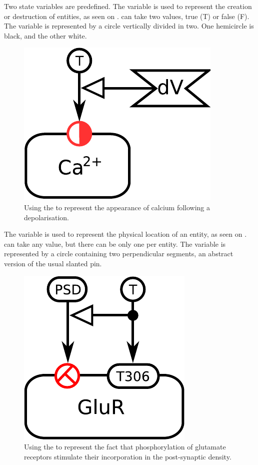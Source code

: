 Two state variables are predefined. The variable  is used to represent the creation or destruction of entities, as seen on \label{sec:existence}.  can take two values, true (T) or false (F). The variable is represented by a circle vertically divided in two. One hemicircle is black, and the other white. 

\begin{figure}[H]
  \centering
  \includegraphics[scale = 0.5]{examples/ex-existence}
  \caption{Using the   to represent the appearance of calcium following a depolarisation.}
  \label{fig:ex-existence}
\end{figure}

The variable  is used to represent the physical location of an entity, as seen on \label{sec:location}.  can take any value, but there can be only one  per entity. The variable is represented by a circle containing two perpendicular segments, an abstract version of the usual slanted pin.

\begin{figure}[H]
  \centering
  \includegraphics[scale = 0.5]{examples/ex-location-2}
  \caption{Using the   to represent the fact that phosphorylation of glutamate receptors stimulate their incorporation in the post-synaptic density.}
  \label{fig:ex-location}
\end{figure}



